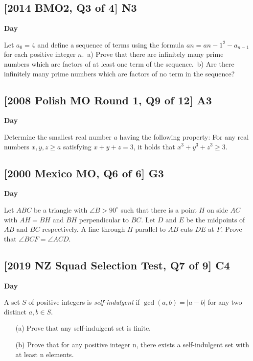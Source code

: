 \documentclass[10pt]{article}
\newcommand{\themonth}{March}
\newcommand{\theyear}{2019}
\newcounter{day}
\newcounter{solution}
\newcounter{datenumber}
\newcommand{\problem}[4][0]{
	\newpage
	\subsection{[#3] \space #2} \hfill 
	{\large\textbf{Day \arabic{day}}} %
	\begin{flushleft} #4 \end{flushleft}
	\vspace{1em}
	\addtocounter{day}{1}
	\addtocounter{datenumber}{1}
	\setcounter{solution}{1}
}
\begin{document}
\problem[50]{N3}{2014 BMO2, Q3 of 4}{Let $a_0 = 4$ and define a sequence of terms using the formula $an = a{n-1}^2 - a_{n-1}$ for each positive integer $n$.\
	a) Prove that there are infinitely many prime numbers which are factors of at least one term of the sequence.\
	b) Are there infinitely many prime numbers which are factors of no term in the sequence?}

\problem[51]{A3}{2008 Polish MO Round 1, Q9 of 12}{Determine the smallest real number $a$ having the following property: For any real numbers $x,y,z \geq a$ satisfying $x+y+z = 3$, it holds that $x^3 + y^3 + z^3 \geq 3$.}

\problem[52]{G3}{2000 Mexico MO, Q6 of 6}{Let $ABC$ be a triangle with $\angle B > 90^{\circ}$ such that there is a point $H$ on side $AC$ with $AH = BH$ and $BH$ perpendicular to $BC$. Let $D$ and $E$ be the midpoints of $AB$ and $BC$ respectively. A line through $H$ parallel to $AB$ cuts $DE$ at $F$. Prove that $\angle BCF = \angle ACD$.}

\problem[53]{C4}{2019 NZ Squad Selection Test, Q7 of 9}{A set $S$ of positive integers is \textit{self-indulgent} if $\gcd (a, b) = \vert a - b \vert$ for any two distinct $a, b \in S$. \begin{itemize} \item[(a)] Prove that any self-indulgent set is finite. \item[(b)] Prove that for any positive integer n, there exists a self-indulgent set with at least n elements. \end{itemize}}
\end{document}

